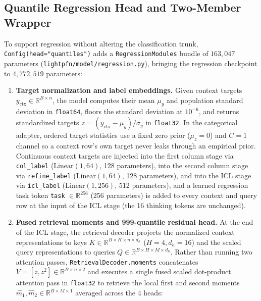 \documentclass[11pt]{article}
\newcommand{\R}{\mathbb{R}}
\begin{document}
\subsection{Quantile Regression Head and Two-Member Wrapper}
\label{sec:reg-head}

To support regression without altering the classification trunk, \texttt{Config(head="quantiles")} adds a \texttt{RegressionModules} bundle of $163{,}047$ parameters (\texttt{lightpfn/model/regression.py}), bringing the regression checkpoint to $4{,}772{,}519$ parameters: %
\begin{enumerate}
\item \textbf{Target normalization and label embeddings.}
Given context targets $y_{\text{ctx}}\in\R^{B\times n}$, the model computes their mean $\mu_y$ and population standard deviation in \texttt{float64}, floors the standard deviation at $10^{-6}$, and returns standardized targets $z=(y_{\text{ctx}}-\mu_y)/\sigma_y$ in \texttt{float32}. %
In the categorical adapter, ordered target statistics use a fixed zero prior ($\mu_z = 0$) and $C=1$ channel so a context row's own target never leaks through an empirical prior. %
Continuous context targets are injected into the first column stage via \texttt{col\_label} ($\mathrm{Linear}(1, 64)$, 128 parameters), into the second column stage via \texttt{refine\_label} ($\mathrm{Linear}(1, 64)$, 128 parameters), and into the ICL stage via \texttt{icl\_label} ($\mathrm{Linear}(1, 256)$, 512 parameters), and a learned regression task token \texttt{task} $\in \R^{256}$ (256 parameters) is added to every context and query row at the input of the ICL stage (the 16 thinking tokens are unchanged). %
\item \textbf{Fused retrieval moments and 999-quantile residual head.}
At the end of the ICL stage, the retrieval decoder projects the normalized context representations to keys $K \in \R^{B \times H \times n \times d_h}$ ($H=4, d_h=16$) and the scaled query representations to queries $Q \in \R^{B \times H \times M \times d_h}$.
Rather than running two attention passes, \texttt{RetrievalDecoder.moments} concatenates $V = [z, z^2] \in \R^{B \times n \times 2}$ and executes a single fused scaled dot-product attention pass in \texttt{float32} to retrieve the local first and second moments $\hat{m}_1, \hat{m}_2 \in \R^{B \times M \times 1}$ averaged across the 4 heads: %
\begin{equation}

\end{equation}
\end{enumerate}
\end{document}
